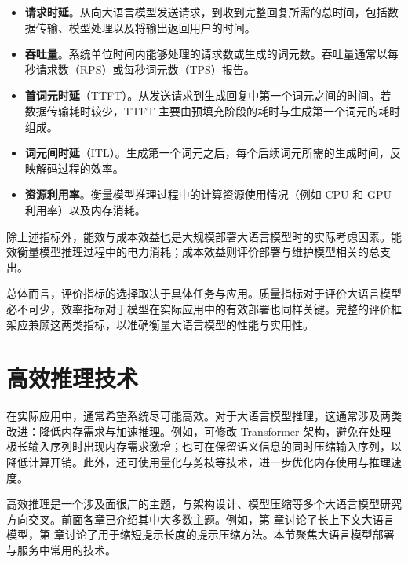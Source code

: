 \begin{itemize}
\item \vspace{0.5em} \textbf{请求时延}。从向大语言模型发送请求，到收到完整回复所需的总时间，包括数据传输、模型处理以及将输出返回用户的时间。
\item \vspace{0.3em} \textbf{吞吐量}。系统单位时间内能够处理的请求数或生成的词元数。吞吐量通常以每秒请求数（RPS）或每秒词元数（TPS）报告。
\item \vspace{0.3em} \textbf{首词元时延}（TTFT）。从发送请求到生成回复中第一个词元之间的时间。若数据传输耗时较少，TTFT 主要由预填充阶段的耗时与生成第一个词元的耗时组成。
\item \vspace{0.3em} \textbf{词元间时延}（ITL）。生成第一个词元之后，每个后续词元所需的生成时间，反映解码过程的效率。
\item \vspace{0.3em} \textbf{资源利用率}。衡量模型推理过程中的计算资源使用情况（例如 CPU 和 GPU 利用率）以及内存消耗。
\end{itemize}
\vspace{0.5em}

除上述指标外，能效与成本效益也是大规模部署大语言模型时的实际考虑因素。能效衡量模型推理过程中的电力消耗；成本效益则评价部署与维护模型相关的总支出。

总体而言，评价指标的选择取决于具体任务与应用。质量指标对于评价大语言模型必不可少，效率指标对于模型在实际应用中的有效部署也同样关键。完整的评价框架应兼顾这两类指标，以准确衡量大语言模型的性能与实用性。


\section{高效推理技术}

在实际应用中，通常希望系统尽可能高效。对于大语言模型推理，这通常涉及两类改进：降低内存需求与加速推理。例如，可修改 Transformer 架构，避免在处理极长输入序列时出现内存需求激增；也可在保留语义信息的同时压缩输入序列，以降低计算开销。此外，还可使用量化与剪枝等技术，进一步优化内存使用与推理速度。

高效推理是一个涉及面很广的主题，与架构设计、模型压缩等多个大语言模型研究方向交叉。前面各章已介绍其中大多数主题。例如，第 \ChapterLLM 章讨论了长上下文大语言模型，第 \ChapterLLMPrompting 章讨论了用于缩短提示长度的提示压缩方法。本节聚焦大语言模型部署与服务中常用的技术。

